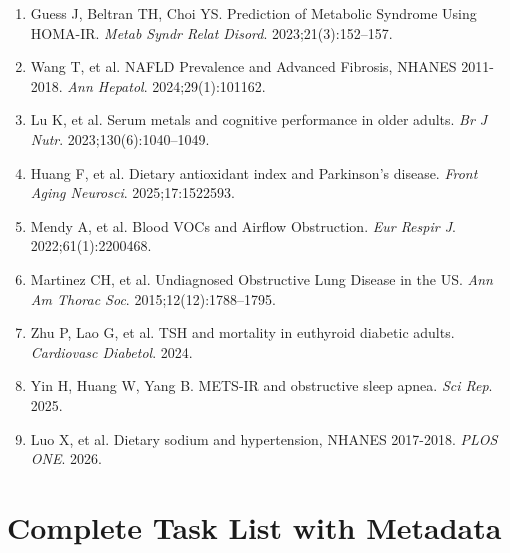 \documentclass[12pt]{article}
\begin{document}
\begin{enumerate}
\item Guess J, Beltran TH, Choi YS. Prediction of Metabolic Syndrome Using HOMA-IR. \textit{Metab Syndr Relat Disord}. 2023;21(3):152--157.
\item Wang T, et al. NAFLD Prevalence and Advanced Fibrosis, NHANES 2011-2018. \textit{Ann Hepatol}. 2024;29(1):101162.
\item Lu K, et al. Serum metals and cognitive performance in older adults. \textit{Br J Nutr}. 2023;130(6):1040--1049.
\item Huang F, et al. Dietary antioxidant index and Parkinson's disease. \textit{Front Aging Neurosci}. 2025;17:1522593.
\item Mendy A, et al. Blood VOCs and Airflow Obstruction. \textit{Eur Respir J}. 2022;61(1):2200468.
\item Martinez CH, et al. Undiagnosed Obstructive Lung Disease in the US. \textit{Ann Am Thorac Soc}. 2015;12(12):1788--1795.
\item Zhu P, Lao G, et al. TSH and mortality in euthyroid diabetic adults. \textit{Cardiovasc Diabetol}. 2024.
\item Yin H, Huang W, Yang B. METS-IR and obstructive sleep apnea. \textit{Sci Rep}. 2025.
\item Luo X, et al. Dietary sodium and hypertension, NHANES 2017-2018. \textit{PLOS ONE}. 2026.
\end{enumerate}

\appendix

\section{Complete Task List with Metadata}
\end{document}
